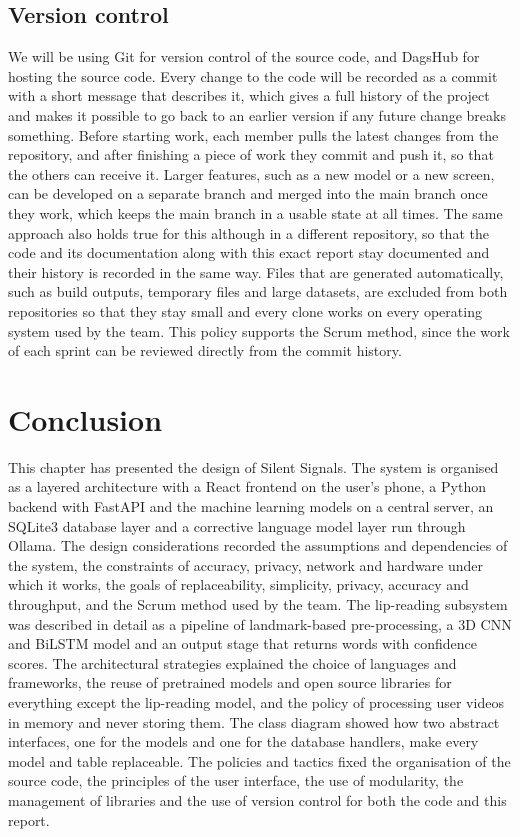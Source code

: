 \documentclass{FastFyp}
\begin{document}
\subsection{Version control}
We will be using Git for version control of the source code, and DagsHub for hosting the source code. Every change to the code will be recorded as a commit with a short message that describes it, which gives a full history of the project and makes it possible to go back to an earlier version if any future change breaks something. Before starting work, each member pulls the latest changes from the repository, and after finishing a piece of work they commit and push it, so that the others can receive it. Larger features, such as a new model or a new screen, can be developed on a separate branch and merged into the main branch once they work, which keeps the main branch in a usable state at all times. The same approach also holds true for this although in a different repository, so that the code and its documentation along with this exact report stay documented and their history is recorded in the same way. Files that are generated automatically, such as build outputs, temporary files and large datasets, are excluded from both repositories so that they stay small and every clone works on every operating system used by the team. This policy supports the Scrum method, since the work of each sprint can be reviewed directly from the commit history.

\section{Conclusion}
This chapter has presented the design of Silent Signals. The system is organised as a layered architecture with a React frontend on the user's phone, a Python backend with FastAPI and the machine learning models on a central server, an SQLite3 database layer and a corrective language model layer run through Ollama. The design considerations recorded the assumptions and dependencies of the system, the constraints of accuracy, privacy, network and hardware under which it works, the goals of replaceability, simplicity, privacy, accuracy and throughput, and the Scrum method used by the team. The lip-reading subsystem was described in detail as a pipeline of landmark-based pre-processing, a 3D CNN and BiLSTM model and an output stage that returns words with confidence scores. The architectural strategies explained the choice of languages and frameworks, the reuse of pretrained models and open source libraries for everything except the lip-reading model, and the policy of processing user videos in memory and never storing them. The class diagram showed how two abstract interfaces, one for the models and one for the database handlers, make every model and table replaceable. The policies and tactics fixed the organisation of the source code, the principles of the user interface, the use of modularity, the management of libraries and the use of version control for both the code and this report.
\end{document}
